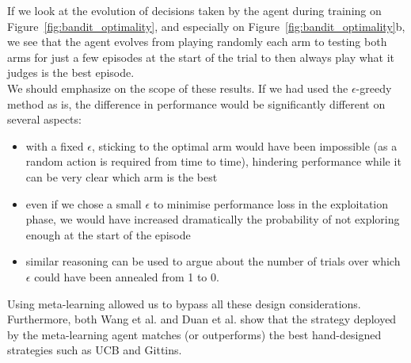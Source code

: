 If we look at the evolution of decisions taken by the agent during training
on Figure~\ref{fig:bandit_optimality}, and especially on
Figure~\ref{fig:bandit_optimality}b, we see that the agent evolves from playing
randomly each arm to testing both arms for just a few episodes at the start
of the trial to then always play what it judges is the best episode.\\

We should emphasize on the scope of these results. If we had used the 
$\epsilon$-greedy method as is, the difference in performance would be 
significantly different on several aspects:
\begin{itemize}
	\item with a fixed $\epsilon$, sticking to the optimal arm would have
		been impossible (as a random action is required from time to 
		time), hindering performance while it can be very clear
		which arm is the best
	\item even if we chose a small $\epsilon$ to minimise performance loss
		in the exploitation phase, we would have increased dramatically
		the probability of not exploring enough at the start of the 
		episode
	\item similar reasoning can be used to argue about the number of 
		trials over which $\epsilon$ could have been annealed from
		1 to 0.
\end{itemize}
Using meta-learning allowed us to bypass all these design considerations.
Furthermore, both Wang et al. \cite{learningtorl} and Duan et al. 
\cite{fastrlviaslowrl} show that the strategy deployed by the meta-learning
agent matches (or outperforms) the best hand-designed strategies such as 
UCB and Gittins.

